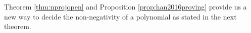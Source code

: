 \documentclass[amsthm]{elsart}
\def \Bproj  {{\tt Bp}}
\def  \zero {{\rm Zero}}
\def  \Nproj {{\tt Np}}
\def  \Hproj {{\tt Hp}}
\def \RR {{\mathbb R}}
\def \ZZ {{\mathbb Z}}
\newcommand{\va}{\bm{\alpha}}
\newcommand{\xx}{\bm{x}}
\begin{document}
\begin{comment}
\begin{thm} \label{thm:nprojopen}
        Let $j$ be an integer and $2\le j\le n$. For any given polynomial $f(\xx_n)\in \ZZ[\bm{x}_n]$, and any open connected set $U$ of $\Nproj(f,[x_n,\ldots,x_j])\neq0$ in $\RR^{j-1}$, let
$$S=U\backslash\zero(\{\Nproj(f,[x_n,\dots,x_j],x_t)\mid t=j,\ldots,n\}).$$ If the polynomials in $\bigcup_{i=0}^{n-j} \Nproj_{1}(f,[x_{n-i}])$ are all semi-definite on $U\times \RR^{n-j}$, $f(\xx_n)$ is open delineable on $S$ w.r.t. $\overline{\Nproj}(f,j)$ and $\widetilde{\Nproj}(f,j)$.
\end{thm}
\begin{pf}
Notice that the proof of Theorem \ref{thm:smhp} only uses the properties of open delineable (Propositions \ref{prop:sample}-\ref{prop:union}) and Proposition \ref{prop:open}($f$ is open delineable on every open connected set defined by $\Bproj(f,[x_{n}])\neq0$ in $\RR^{n-1}$ w.r.t. $\overline{\Hproj}(f,n)$ and ${\Hproj^{\vartriangle}}(f,n)$). According to Proposition \ref{pr:6}, $f$ is open delineable on every open connected set defined by $\Nproj(f,[x_{n}])\neq0$ in $\RR^{n-1}$ w.r.t. $\overline{\Nproj}(f,n)$ and $\widetilde{\Nproj}(f,n)$. The same proof of Theorem \ref{thm:smhp} will yield the conclusion of the theorem.
\end{pf}
\begin{thm}\label{th:6}
Let $f\in\ZZ[\xx_{n}]$ be a squarefree polynomial with level $n$ and $U$ a connected open set of $\Nproj(f,[x_{n},\ldots,x_j])\neq0$ in $\RR^{j-1}$. Denote $S=U\backslash\zero(\{\Nproj(f,[x_n,\dots,x_j],x_t)\mid t=j,\ldots,n\})$. The necessary and sufficient condition for $f(\xx_n)$ to be positive semi-definite on $U\times \RR^{n-j+1}$ is the following two conditions hold.\\
        $(1)$The polynomials in $\bigcup_{i=0}^{n-j} \Nproj_{1}(f,[x_{n-i}])$ are all semi-definite on $U\times \RR^{n-j}$.\\
        $(2)$There exists a point $\va \in S$ such that $f(\va,x_j,\ldots,x_n)$ is positive semi-definite on $\RR^{n-j+1}$.
\end{thm}
\end{comment}
Theorem \ref{thm:nprojopen} and Proposition \ref{prop:han2016proving} provide us a new way to decide the non-negativity of a polynomial as stated in the next theorem.
\end{document}
